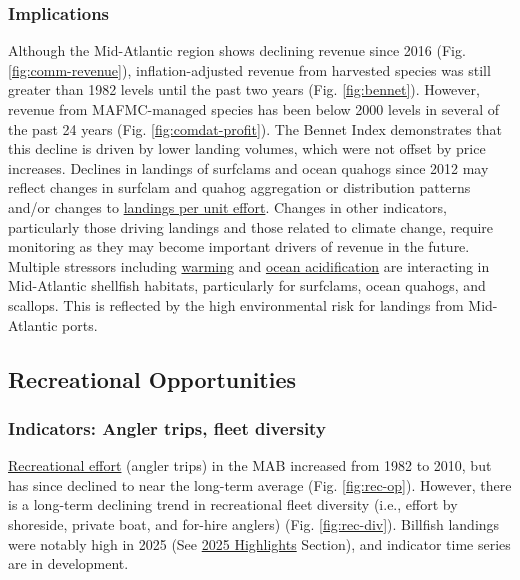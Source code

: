 \documentclass[
  10pt,
]{article}
\begin{document}
\subsubsection{Implications}\label{implications-1}

Although the Mid-Atlantic region shows declining revenue since 2016 (Fig. \ref{fig:comm-revenue}), inflation-adjusted revenue from harvested species was still greater than 1982 levels until the past two years (Fig. \ref{fig:bennet}). However, revenue from MAFMC-managed species has been below 2000 levels in several of the past 24 years (Fig. \ref{fig:comdat-profit}). The Bennet Index demonstrates that this decline is driven by lower landing volumes, which were not offset by price increases. Declines in landings of surfclams and ocean quahogs since 2012 may reflect changes in surfclam and quahog aggregation or distribution patterns and/or changes to \href{https://noaa-edab.github.io/catalog/effective_sweptarea.html}{landings per unit effort}. Changes in other indicators, particularly those driving landings and those related to climate change, require monitoring as they may become important drivers of revenue in the future. Multiple stressors including \href{https://noaa-edab.github.io/catalog/bottom_temp_insitu.html}{warming} and \href{https://noaa-edab.github.io/catalog/ocean_acidification}{ocean acidification} are interacting in Mid-Atlantic shellfish habitats, particularly for surfclams, ocean quahogs, and scallops. This is reflected by the high environmental risk for landings from Mid-Atlantic ports.

\subsection{Recreational Opportunities}\label{recreational-opportunities}

\subsubsection{Indicators: Angler trips, fleet diversity}\label{indicators-angler-trips-fleet-diversity}

\href{https://noaa-edab.github.io/catalog/recdat.html}{Recreational effort} (angler trips) in the MAB increased from 1982 to 2010, but has since declined to near the long-term average (Fig. \ref{fig:rec-op}). However, there is a long-term declining trend in recreational fleet diversity (i.e., effort by shoreside, private boat, and for-hire anglers) (Fig. \ref{fig:rec-div}). Billfish landings were notably high in 2025 (See \href{https://noaa-edab.github.io/catalog/observation_synthesis_2025.html}{2025 Highlights} Section), and indicator time series are in development.
\end{document}
